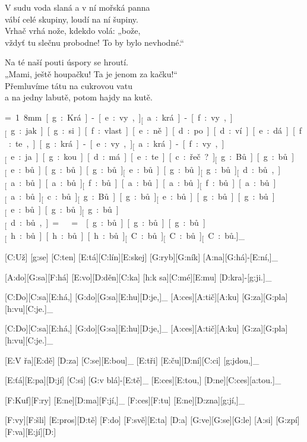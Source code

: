 V sudu voda slaná a v ní mořská panna\\
vábí celé skupiny, loudí na ní šupiny.\\
Vrhač vrhá nože, kdekdo volá: „bože,\\
vždyť tu slečnu probodne! To by bylo nevhodné.“

Na té naší pouti úspory se hroutí.\\
„Mami, ještě houpačku! Ta je jenom za kačku!“\\
Přemluvíme tátu na cukrovou vatu\\
a na jedny labutě, potom hajdy na kutě.



{\unit=1.8mm
[g:Krá]-[e:vy,]_ [a:krá]-[f:vy,]_
[g:jak] [g:si] [f:vlast][e:ně] [d:po][d:ví][e:dá][f:te,]

[g:krá]-[e:vy,]_ [a:krá]-[f:vy,]_
[e:ja][g:kou] [d:má][e:te] [c:řeč?]_

[g:Bů] [g:bů]_ [e:bů] [g:bů] [g:bů]_
[e:bů] [g:bů]_ [g:bů]_ [d:bů,]_

[a:bů] [a:bů]_ [f:bů] [a:bů] [a:bů]_
[f:bů] [a:bů]_ [a:bů]_ [c:bů.]_

[g:Bů] [g:bů]_ [e:bů] [g:bů] [g:bů]_
[e:bů] [g:bů]_ [g:bů]_ [d:bů,]_

\min=
\max=
[g:bů] [g:bů] [g:bů]_
[h:bů] [h:bů] [h:bů]_
[C:bů]_ [C:bů]_ [C:bů.]_
}



[C:Už] [g:se] [C:ten] [E:tá][C:lín][E:skej] [G:ryb][G:ník] [A:na][G:há]-[E:ní,]_

[A:do][G:sa][F:há] [E:vo][D:děn][C:ka] [h:k sa][C:mé][E:mu] [D:kra]-[g:ji.]_

[C:Do][C:sa][E:há,] [G:do][G:sa][E:hu][D:je,]_
[A:ces][A:tič][A:ku] [G:za][G:pla][h:vu][C:je.]_

[C:Do][C:sa][E:há,] [G:do][G:sa][E:hu][D:je,]_
[A:ces][A:tič][A:ku] [G:za][G:pla][h:vu][C:je.]_



[E:V řa][E:dě] [D:za] [C:se][E:bou]_
[E:tři] [E:ču][D:ní][C:ci] [g:jdou,]_

[E:ťá][E:pa][D:jí] [C:si] [G:v blá]-[E:tě]_
[E:ces][E:tou,] [D:ne][C:ces][a:tou.]_

[F:Kuf][F:ry] [E:ne][D:ma][F:jí,]_
[F:ces][F:tu] [E:ne][D:zna][g:jí,]_

[F:vy][F:šli] [E:pros][D:tě] %
[F:do] [F:svě][E:ta] [D:a] %
[G:ve][G:se][G:le] [A:si] %
[G:zpí][F:va][E:jí][D:]

